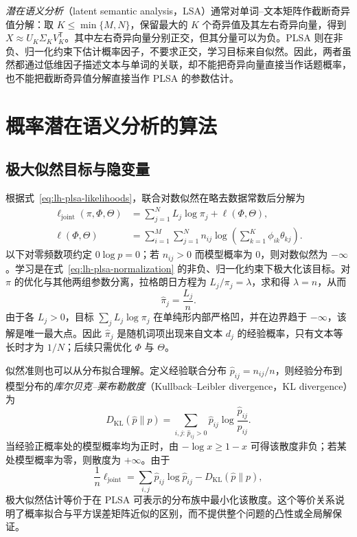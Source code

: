 \emph{潜在语义分析}（latent semantic analysis，LSA）通常对单词--文本矩阵作截断奇异值分解：取 $K\leq\min\{M,N\}$，保留最大的 $K$ 个奇异值及其左右奇异向量，得到 $X\approx U_K\Sigma_KV_K^{\mathsf T}$。其中左右奇异向量分别正交，但其分量可以为负。PLSA 则在非负、归一化约束下估计概率因子，不要求正交，学习目标来自似然。因此，两者虽然都通过低维因子描述文本与单词的关联，却不能把奇异向量直接当作话题概率，也不能把截断奇异值分解直接当作 PLSA 的参数估计。

\section{概率潜在语义分析的算法}
\label{sec:lh-plsa-algorithm}

\subsection{极大似然目标与隐变量}
\label{subsec:lh-plsa-objective}

根据式~\eqref{eq:lh-plsa-likelihoods}，联合对数似然在略去数据常数后分解为
\begin{equation}
\begin{aligned}
\ell_{\mathrm{joint}}(\pi,\Phi,\Theta)
&=\sum_{j=1}^N L_j\log\pi_j+\ell(\Phi,\Theta),\\
\ell(\Phi,\Theta)&=\sum_{i=1}^M\sum_{j=1}^N
n_{ij}\log\left(\sum_{k=1}^K\phi_{ik}\theta_{kj}\right).
\end{aligned}
\label{eq:lh-plsa-loglikelihood}
\end{equation}
以下对零频数项约定 $0\log p=0$；若 $n_{ij}>0$ 而模型概率为 $0$，则对数似然为 $-\infty$。学习是在式~\eqref{eq:lh-plsa-normalization} 的非负、归一化约束下极大化该目标。对 $\pi$ 的优化与其他两组参数分离，拉格朗日方程为 $L_j/\pi_j=\lambda$，求和得 $\lambda=n$，从而
\begin{equation}
\widehat\pi_j=\frac{L_j}{n}.
\label{eq:lh-plsa-document-marginal}
\end{equation}
由于各 $L_j>0$，目标 $\sum_jL_j\log\pi_j$ 在单纯形内部严格凹，并在边界趋于 $-\infty$，该解是唯一最大点。因此 $\widehat\pi_j$ 是随机词项出现来自文本 $d_j$ 的经验概率，只有文本等长时才为 $1/N$；后续只需优化 $\Phi$ 与 $\Theta$。

似然准则也可以从分布拟合理解。定义经验联合分布 $\widehat p_{ij}=n_{ij}/n$，则经验分布到模型分布的\emph{库尔贝克--莱布勒散度}（Kullback--Leibler divergence，KL divergence）为
\begin{equation}
D_{\mathrm{KL}}(\widehat p\|p)
=\sum_{i,j:\,\widehat p_{ij}>0}\widehat p_{ij}
\log\frac{\widehat p_{ij}}{p_{ij}}.
\label{eq:lh-plsa-kl}
\end{equation}
当经验正概率处的模型概率均为正时，由 $-\log x\geq1-x$ 可得该散度非负；若某处模型概率为零，则散度为 $+\infty$。由于
\[
\frac1n\ell_{\mathrm{joint}}
=\sum_{i,j}\widehat p_{ij}\log\widehat p_{ij}
-D_{\mathrm{KL}}(\widehat p\|p),
\]
极大似然估计等价于在 PLSA 可表示的分布族中最小化该散度。这个等价关系说明了概率拟合与平方误差矩阵近似的区别，而不提供整个问题的凸性或全局解保证。

